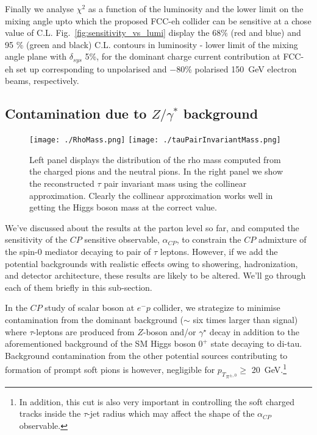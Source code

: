 \documentclass[pdftex,twocolumn,epjc3]{svjour3}          %
\begin{document}
\par Finally we analyse $\chi^2$ as a function of the  luminosity and the lower limit on the mixing angle upto which the proposed FCC-eh collider  can be sensitive at a chose value of  C.L.   Fig.~\ref{fig:sensitivity_vs_lumi} display the 68\% (red and blue) and 95 \% (green and black)  C.L. contours  in luminosity - lower limit of the mixing angle plane   with $\delta_{sys}$ 5\%, for the dominant charge current contribution  at FCC-eh set up corresponding to unpolarised  and $-$80\% polarised  150~GeV electron beams, respectively.


\subsection{Contamination due to $Z/\gamma^*$ background}
\label{BGZGammaContrib}

%
\begin{figure*}[t]
\texttt{[image: ./RhoMass.png]}
\texttt{[image: ./tauPairInvariantMass.png]}
\caption{  {\small Left panel displays the distribution of the rho mass computed from the charged pions and the neutral pions. In the right panel we show the reconstructed $\tau$ pair invariant mass using the collinear approximation. Clearly the collinear approximation works well in getting the Higgs boson mass at the correct value.}}
	\label{fig:RhoMassMtautauInvMass}
\end{figure*}
%
We've discussed about the results at the parton level so far, and computed the sensitivity of the $CP$ sensitive observable, $\alpha_{CP}$, to constrain the $CP$ admixture of the spin-0 mediator decaying to pair of $\tau$ leptons. However, if we add the potential backgrounds with realistic effects owing to showering, hadronization, and detector architecture, these results are likely to be altered. We'll go through each of them briefly in this sub-section.


\par In the $CP$ study of scalar boson at $e^-p$ collider, we strategize to minimise contamination from the dominant background ($\sim$ six times larger than signal) where $\tau$-leptons are produced from $Z$-boson and/or $\gamma^\star$ decay in addition to the aforementioned background of the SM Higgs boson $0^+$ state decaying to di-tau. Background contamination from the other potential sources contributing to formation of prompt soft pions is however, negligible for ${p_T}_{\pi^{\pm,0}}\ge$ 20~GeV.\footnote{In addition, this cut is also very important in controlling the soft charged tracks inside the $\tau$-jet radius which may affect the shape of the $\alpha_{CP}$ observable.}
\end{document}
